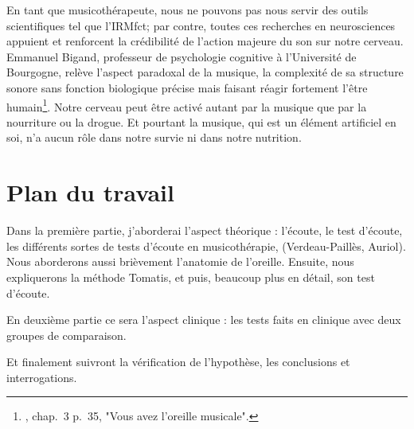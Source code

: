 En tant que musicothérapeute, nous ne pouvons pas  nous servir des outils
scientifiques tel que l'IRMfct; par contre, toutes ces recherches en
neurosciences appuient et renforcent la crédibilité de l'action
majeure du son sur notre cerveau.  Emmanuel Bigand, professeur de
psychologie cognitive à l'Université de Bourgogne, relève l'aspect
paradoxal de la musique, la complexité de sa structure sonore sans
fonction biologique précise mais faisant réagir fortement l'être
humain\footnote{\cite{AuteurInconnu2011}, chap.~3 p.~35, "Vous avez l'oreille musicale".}.  Notre cerveau peut être activé autant par
la musique que par la nourriture ou la drogue. Et pourtant la musique,
qui est un élément artificiel en soi, n'a aucun rôle dans notre survie ni dans
notre nutrition.


\section{Plan du travail}

Dans la première partie, j'aborderai l'aspect théorique : l'écoute, le test d'écoute, les différents sortes de tests d'écoute en musicothérapie, (Verdeau-Paillès, Auriol). Nous aborderons aussi brièvement l'anatomie de l'oreille. Ensuite, nous expliquerons la méthode Tomatis,
et puis, beaucoup plus en détail, son test d'écoute.

En deuxième partie ce sera l'aspect clinique : les tests faits en clinique avec deux groupes de
comparaison.

Et finalement suivront la vérification de l'hypothèse, les conclusions et interrogations.
